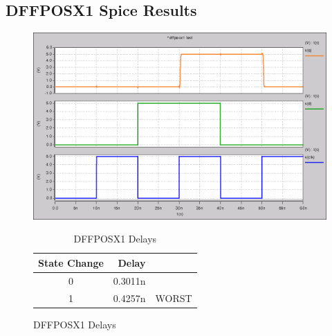     \subsection{DFFPOSX1 Spice Results}

        

        \begin{figure}[H]
            \centering
            \begin{minipage}[t]{.50\textwidth}
                \vspace{0pt}
                \centering
                \includegraphics[width=\linewidth]{../../spice/dffposx1.png}
                \caption{DFFPOSX1 Spice Results}
            \end{minipage}
            \hfill
            \begin{minipage}[t]{.45\textwidth}
                \vspace{0pt}

                \begin{table}[H]
                    \centering
                    \begin{tabular}{crc}
                        \toprule
                        \textbf{State Change} & \textbf{Delay} & \\
                        \midrule
                        0 & 0.3011n & \\
                        1 & 0.4257n & WORST \\
                        \bottomrule
                    \end{tabular}
                    \caption{DFFPOSX1 Delays}
                \end{table}
            \end{minipage}
        \end{figure}

